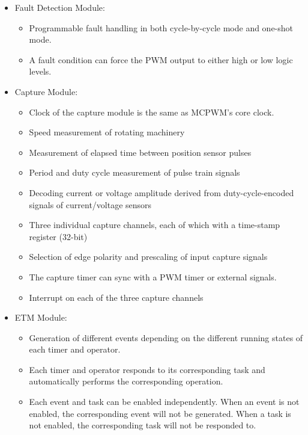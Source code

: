\documentclass[main\_\_EN.tex]{subfiles}
\begin{document}
\begin{itemize}
    \item Fault Detection Module:
        \begin{itemize} 
            \item Programmable fault handling in both cycle-by-cycle mode and one-shot mode.
            \item A fault condition can force the PWM output to either high or low logic levels.
        \end{itemize}
    \item Capture Module:
        \begin{itemize}
            \item Clock of the capture module is the same as MCPWM's core clock.
            \item Speed measurement of rotating machinery
            \item Measurement of elapsed time between position sensor pulses
            \item Period and duty cycle measurement of pulse train signals
            \item Decoding current or voltage amplitude derived from duty-cycle-encoded signals of current/voltage sensors
            \item Three individual capture channels, each of which with a time-stamp register (32-bit)
            \item Selection of edge polarity and prescaling of input capture signals
            \item The capture timer can sync with a PWM timer or external signals.
            \item Interrupt on each of the three capture channels
        \end{itemize}
    \item ETM Module:
        \begin{itemize}
            \item Generation of different events depending on the different running states of each timer and operator.
            \item Each timer and operator responds to its corresponding task and automatically performs the corresponding operation.
            \item Each event and task can be enabled independently. When an event is not enabled, the corresponding event will not be generated. When a task is not enabled, the corresponding task will not be responded to.
        \end{itemize}
\end{itemize}
\clearpage
\end{document}
